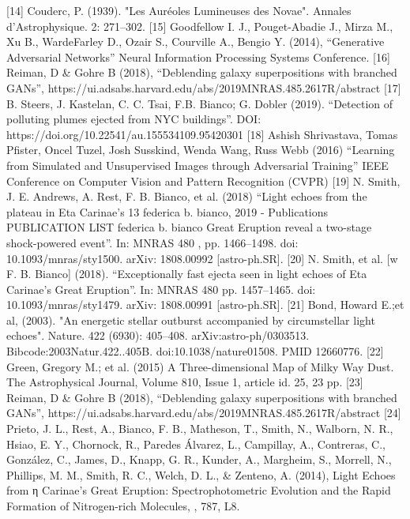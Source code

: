 [14] Couderc, P. (1939). "Les Auréoles Lumineuses des Novae". Annales d'Astrophysique. 2: 271–302. 
[15] Goodfellow I. J., Pouget-Abadie J., Mirza M., Xu B., WardeFarley D., Ozair S., Courville A., Bengio Y. (2014), “Generative Adversarial Networks” Neural Information Processing Systems Conference.
[16] Reiman, D & Gohre B (2018), “Deblending galaxy superpositions with branched GANs”, https://ui.adsabs.harvard.edu/abs/2019MNRAS.485.2617R/abstract
[17] B. Steers, J. Kastelan, C. C. Tsai, F.B. Bianco; G. Dobler (2019). “Detection of polluting plumes ejected from NYC buildings”. DOI: https://doi.org/10.22541/au.155534109.95420301
[18] Ashish Shrivastava, Tomas Pfister, Oncel Tuzel, Josh Susskind, Wenda Wang, Russ Webb (2016) “Learning from Simulated and Unsupervised Images through Adversarial Training” IEEE Conference on Computer Vision and Pattern Recognition (CVPR) 
[19] N. Smith, J. E. Andrews, A. Rest, F. B. Bianco, et al. (2018) “Light echoes from the plateau in Eta Carinae’s 13 federica b. bianco, 2019 - Publications PUBLICATION LIST federica b. bianco Great Eruption reveal a two-stage shock-powered event”. In: MNRAS 480 , pp. 1466–1498. doi: 10.1093/mnras/sty1500. arXiv: 1808.00992 [astro-ph.SR]. 
[20] N. Smith, et al. [w F. B. Bianco] (2018). “Exceptionally fast ejecta seen in light echoes of Eta Carinae’s Great Eruption”. In: MNRAS 480 pp. 1457–1465. doi: 10.1093/mnras/sty1479. arXiv: 1808.00991 [astro-ph.SR].
[21]  Bond, Howard E.;et al, (2003). "An energetic stellar outburst accompanied by circumstellar light echoes". Nature. 422 (6930): 405–408. arXiv:astro-ph/0303513. Bibcode:2003Natur.422..405B. doi:10.1038/nature01508. PMID 12660776.
[22] Green, Gregory M.; et al. (2015) A Three-dimensional Map of Milky Way Dust. The Astrophysical Journal, Volume 810, Issue 1, article id. 25, 23 pp.
[23] Reiman, D & Gohre B (2018), “Deblending galaxy superpositions with branched GANs”, https://ui.adsabs.harvard.edu/abs/2019MNRAS.485.2617R/abstract
[24] Prieto, J. L., Rest, A., Bianco, F. B., Matheson, T., Smith, N., Walborn, N. R., Hsiao, E. Y., Chornock, R., Paredes Álvarez, L., Campillay, A., Contreras, C., González, C., James, D., Knapp, G. R., Kunder, A., Margheim, S., Morrell, N., Phillips, M. M., Smith, R. C., Welch, D. L., & Zenteno, A. (2014), Light Echoes from η Carinae's Great Eruption: Spectrophotometric Evolution and the Rapid Formation of Nitrogen-rich Molecules, \apjl, 787, L8.

